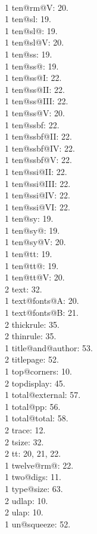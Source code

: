 \\1 ten@rm@V: 20.
\\1 ten@sl: 19.
\\1 ten@sl@: 19.
\\1 ten@sl@V: 20.
\\1 ten@ss: 19.
\\1 ten@ss@: 19.
\\1 ten@ss@I: 22.
\\1 ten@ss@II: 22.
\\1 ten@ss@III: 22.
\\1 ten@ss@V: 20.
\\1 ten@ssbf: 22.
\\1 ten@ssbf@II: 22.
\\1 ten@ssbf@IV: 22.
\\1 ten@ssbf@V: 22.
\\1 ten@ssi@II: 22.
\\1 ten@ssi@III: 22.
\\1 ten@ssi@IV: 22.
\\1 ten@ssi@VI: 22.
\\1 ten@sy: 19.
\\1 ten@sy@: 19.
\\1 ten@sy@V: 20.
\\1 ten@tt: 19.
\\1 ten@tt@: 19.
\\1 ten@tt@V: 20.
\\2 text: 32.
\\1 text@fonts@A: 20.
\\1 text@fonts@B: 21.
\\2 thickrule: 35.
\\2 thinrule: 35.
\\1 title@and@author: 53.
\\2 titlepage: 52.
\\1 top@corners: 10.
\\2 topdisplay: 45.
\\1 total@external: 57.
\\1 total@pp: 56.
\\1 total@total: 58.
\\2 trace: 12.
\\2 tsize: 32.
\\2 tt: 20, 21, 22.
\\1 twelve@rm@: 22.
\\1 two@digs: 11.
\\1 type@size: 63.
\\2 udlap: 10.
\\2 ulap: 10.
\\1 un@squeeze: 52.
